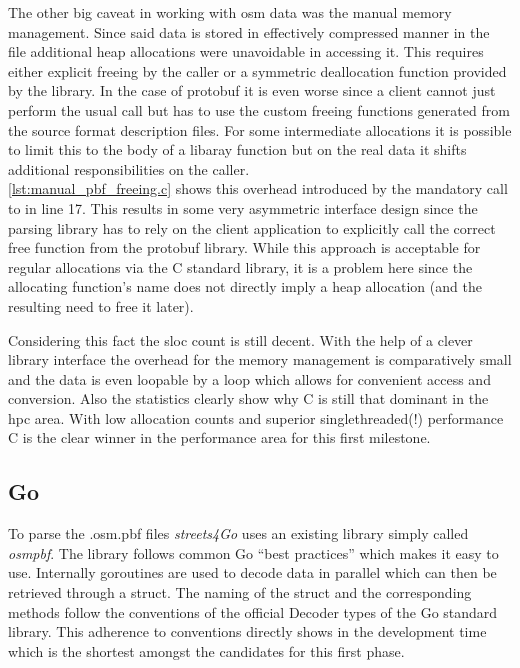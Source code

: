 The other big caveat in working with \gls{osm} data was the manual memory management. Since said data is stored in effectively compressed manner in the file additional heap allocations were unavoidable in accessing it. This requires either explicit freeing by the caller or a symmetric deallocation function provided by the library. In the case of \gls{protobuf} it is even worse since a client cannot just perform the usual  call but has to use the custom freeing functions generated from the source  format description files. For some intermediate allocations it is possible to limit this to the body of a libaray function but on the real data it shifts additional responsibilities on the caller.
\\


\autoref{lst:manual_pbf_freeing.c} shows this overhead introduced by the mandatory call to  in line 17. This results in some very asymmetric interface design since the parsing library has to rely on the client application to explicitly call the correct free function from the \gls{protobuf} library. While this approach is acceptable for regular allocations via the C standard library, it is a problem here since the allocating function's name  does not directly imply a heap allocation (and the resulting need to free it later).

Considering this fact the \gls{sloc} count is still decent. With the help of a clever library interface the overhead for the memory management is comparatively small and the data is even loopable by a  loop which allows for convenient access and conversion. Also the statistics clearly show why C is still that dominant in the \gls{hpc} area. With low allocation counts and superior singlethreaded(!) performance C is the clear winner in the performance area for this first milestone.

\subsection{Go}
\label{subsec:Implementation::Counting::Go}

To parse the .osm.pbf files \textit{streets4Go} uses an existing library simply called \textit{osmpbf}. The library follows common Go ``best practices'' which makes it easy to use. Internally goroutines are used to decode data in parallel which can then be retrieved through a  struct. The naming of the struct and the corresponding methods follow the conventions of the official Decoder types of the Go standard library. This adherence to conventions directly shows in the development time which is the shortest amongst the candidates for this first phase.


